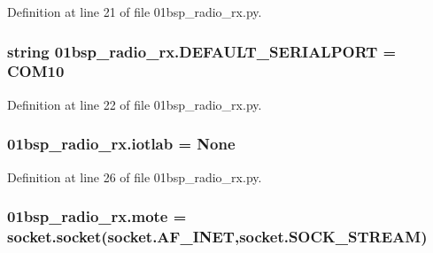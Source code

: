 Definition at line 21 of file 01bsp\+\_\+radio\+\_\+rx.\+py.

\subsubsection[{\texorpdfstring{D\+E\+F\+A\+U\+L\+T\+\_\+\+S\+E\+R\+I\+A\+L\+P\+O\+RT}{DEFAULT_SERIALPORT}}]{\setlength{\rightskip}{0pt plus 5cm}string 01bsp\+\_\+radio\+\_\+rx.\+D\+E\+F\+A\+U\+L\+T\+\_\+\+S\+E\+R\+I\+A\+L\+P\+O\+RT = \textquotesingle{}C\+O\+M10\textquotesingle{}}\hypertarget{namespace01bsp__radio__rx_a0c665114ad67636ce2be1104ebcb3e25}{}\label{namespace01bsp__radio__rx_a0c665114ad67636ce2be1104ebcb3e25}


Definition at line 22 of file 01bsp\+\_\+radio\+\_\+rx.\+py.

\subsubsection[{\texorpdfstring{iotlab}{iotlab}}]{ 01bsp\+\_\+radio\+\_\+rx.\+iotlab = None}\hypertarget{namespace01bsp__radio__rx_a26133b524c864be17671325078cba5fb}{}\label{namespace01bsp__radio__rx_a26133b524c864be17671325078cba5fb}


Definition at line 26 of file 01bsp\+\_\+radio\+\_\+rx.\+py.

\subsubsection[{\texorpdfstring{mote}{mote}}]{\setlength{\rightskip}{0pt plus 5cm}01bsp\+\_\+radio\+\_\+rx.\+mote = socket.\+socket(socket.\+A\+F\+\_\+\+I\+N\+ET,socket.\+S\+O\+C\+K\+\_\+\+S\+T\+R\+E\+AM)}\hypertarget{namespace01bsp__radio__rx_a0748304cc94c73d2ff24e024c7c25548}{}\label{namespace01bsp__radio__rx_a0748304cc94c73d2ff24e024c7c25548}



